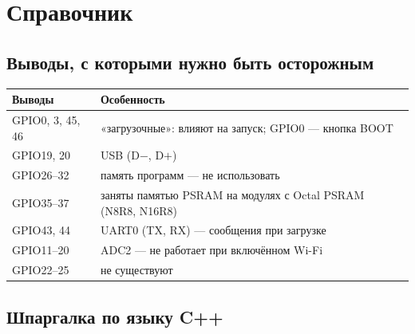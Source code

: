 \section{Справочник}
\subsection*{Выводы, с которыми нужно быть осторожным}

\begin{center}\small
\begin{tabularx}{\textwidth}{@{}l X@{}}
\toprule
Выводы & Особенность \\
\midrule
GPIO0, 3, 45, 46 & «загрузочные»: влияют на запуск; GPIO0 --- кнопка BOOT \\
GPIO19, 20 & USB (D$-$, D$+$) \\
GPIO26--32 & память программ --- не использовать \\
GPIO35--37 & заняты памятью PSRAM на модулях с Octal PSRAM (N8R8, N16R8) \\
GPIO43, 44 & UART0 (TX, RX) --- сообщения при загрузке \\
GPIO11--20 & ADC2 --- не работает при включённом Wi-Fi \\
GPIO22--25 & не существуют \\
\bottomrule
\end{tabularx}
\end{center}

\subsection*{Шпаргалка по языку C++}

